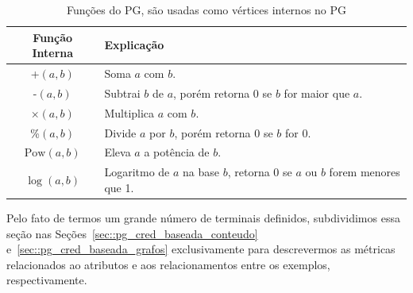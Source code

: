 
\begin{table}[ht*]
\centering
\caption{Funções do \textsc{PG}, são usadas como vértices internos no \textsc{PG}}
\begin{tabular}{|c||l|}
\toprule
    \textbf{Função Interna} & \textbf{Explicação} \\
\midrule
\hline
    +$(a,b)$           & Soma $a$ com $b$. \tabularnewline \hline
    -$(a,b)$           & Subtrai $b$ de $a$, porém retorna 0 se $b$ for maior que $a$.\tabularnewline \hline
    $\times(a,b)$       & Multiplica $a$ com $b$. \tabularnewline \hline
    \%$(a,b)$          & Divide $a$ por $b$, porém retorna 0 se $b$ for 0. \tabularnewline \hline
    $\text{Pow}(a,b)$  & Eleva $a$ a potência de $b$. \tabularnewline \hline 
    $\log(a,b) $       & Logaritmo de $a$ na base $b$, retorna 0 se $a$ ou $b$ forem menores que 1. \tabularnewline
\bottomrule
\end{tabular}
\label{table::funcoespg}
\end{table}

Pelo fato de termos um grande número de terminais definidos, subdividimos essa seção nas Seções~\ref{sec::pg_cred_baseada_conteudo} e~\ref{sec::pg_cred_baseada_grafos} exclusivamente para descrevermos as métricas relacionados ao atributos e aos relacionamentos entre os exemplos, respectivamente. 




